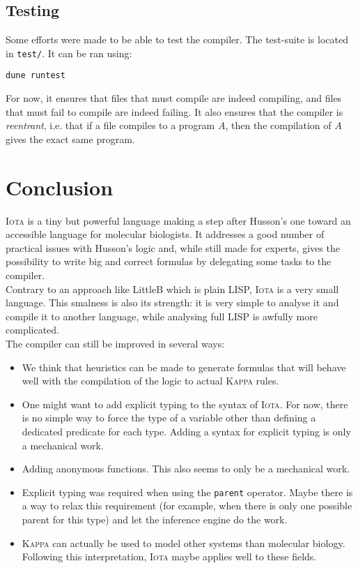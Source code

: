 \documentclass[10pt,a4paper]{article}
\newcommand\Iota{\textsc{Iota}}
\newcommand\Kappa{\textsc{Kappa}}
\newcommand{\ocaml}{\texttt}
\begin{document}
\subsection{Testing}
Some efforts were made to be able to test the compiler. The test-suite is located in \verb|test/|. It can be ran using:
\begin{verbatim}
dune runtest
\end{verbatim}
For now, it ensures that files that must compile are indeed compiling, and files that must fail to compile are indeed failing. It also ensures that the compiler is \emph{reentrant}, i.e. that if a file compiles to a program $A$, then the compilation of $A$ gives the exact same program.

\section{Conclusion}
\Iota{} is a tiny but powerful language making a step after Husson's one toward an accessible language for molecular biologists. It addresses a good number of practical issues with Husson's logic and, while still made for experts, gives the possibility to write big and correct formulas by delegating some tasks to the compiler.\\

Contrary to an approach like LittleB \cite{littleb} which is plain LISP, \Iota{} is a very small language. This smalness is also its strength: it is very simple to analyse it and compile it to another language, while analysing full LISP is awfully more complicated.\\

The compiler can still be improved in several ways:
\begin{itemize}
\item We think that heuristics can be made to generate formulas that will behave well with the compilation of the logic to actual \Kappa{} rules.
\item One might want to add explicit typing to the syntax of \Iota{}. For now, there is no simple way to force the type of a variable other than defining a dedicated predicate for each type. Adding a syntax for explicit typing is only a mechanical work.
\item Adding anonymous functions. This also seems to only be a mechanical work.
\item Explicit typing was required when using the \ocaml{parent} operator. Maybe there is a way to relax this requirement (for example, when there is only one possible parent for this type) and let the inference engine do the work.
\item \Kappa{} can actually be used to model other systems than molecular biology. Following this interpretation, \Iota{} maybe applies well to these fields.
\end{itemize}
\end{document}
